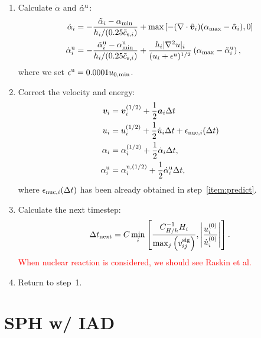 \documentclass[fleqn,dvipdfmx]{article}
\newcommand{\redtext}[1]{\textcolor{red}{#1}}
\begin{document}
\begin{enumerate}
\item Calculate $\dot{\alpha}$ and $\dot{\alpha}^{\rm u}$:
  \begin{align}
    \dot{\alpha}_i &= - \frac{\tilde{\alpha}_i - \alpha_{\rm
        min}}{h_i/(0.25\tilde{c}_{{\rm s},i})} + \max \left[ -(\nabla
      \cdot \tilde{\bm{v}}_i)(\alpha_{\rm max}-\tilde{\alpha}_i), 0
      \right] \\
    \dot{\alpha}^{\rm u}_i &= - \frac{\tilde{\alpha}^{\rm u}_i -
      \alpha_{\rm min}^{\rm u}}{h_i/(0.25\tilde{c}_{{\rm s},i})} +
    \frac{h_i|\nabla^2u|_i}{(u_i+\epsilon^{\rm u})^{1/2}} \left(
    \alpha_{\max} - \tilde{\alpha}^{\rm u}_i \right),
  \end{align}
  where we set $\epsilon^{\rm u}=0.0001u_{0,\min}$.

\item Correct the velocity and energy:
  \begin{align}
    \bm{v}_i &= \bm{v}^{(1/2)}_i + \frac{1}{2} \bm{a}_i \Delta t \\
    u_i &= u^{(1/2)}_i + \frac{1}{2} \dot{u}_i \Delta t +
    \epsilon_{{\rm nuc},i}(\Delta t) \\
    \alpha_i &= \alpha^{(1/2)}_i + \frac{1}{2} \dot{\alpha}_i \Delta
    t, \\
    \alpha^{\rm u}_i &= \alpha^{{\rm u},(1/2)}_i + \frac{1}{2}
    \dot{\alpha}^{\rm u}_i \Delta t,
  \end{align}
  where $\epsilon_{{\rm nuc},i}(\Delta t)$ has been already obtained
  in step~\ref{item:predict}.

\item Calculate the next timestep:
  \begin{align}
    \Delta t_{\rm next} = C \min_i \left[
      \frac{C_{H/h}^{-1}H_i}{\max_j \left( v_{ij}^{\rm sig} \right) },
      \left| \frac{u_i^{(0)}}{\dot{u}_i^{(0)}} \right| \right].
  \end{align}  
  \redtext{When nuclear reaction is considered, we should see Raskin
    et al.}

\item Return to step~1.
\end{enumerate}

\section{SPH w/ IAD}
\end{document}
